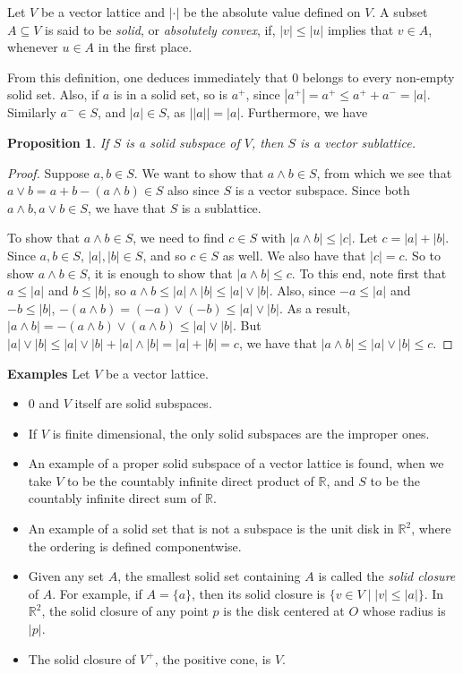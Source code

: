 \documentclass[12pt]{article}
\newtheorem{prop}{Proposition}
\begin{document}
Let $V$ be a vector lattice and $|\cdot|$ be the absolute value defined on $V$.  A subset $A\subseteq V$ is said to be \emph{solid}, or \emph{absolutely convex}, if, $|v|\le |u|$ implies that $v\in A$, whenever $u\in A$ in the first place.

From this definition, one deduces immediately that $0$ belongs to every non-empty solid set.  Also, if $a$ is in a solid set, so is $a^+$, since $|a^+|=a^+\le a^++a^-=|a|$.  Similarly $a^-\in S$, and $|a|\in S$, as $||a||=|a|$.  Furthermore, we have 
\begin{prop}  If $S$ is a solid subspace of $V$, then $S$ is a vector sublattice. \end{prop}
\begin{proof}
Suppose $a,b\in S$.  We want to show that $a\wedge b\in S$, from which we see that $a\vee b= a+b-(a\wedge b)\in S$ also since $S$ is a vector subspace.  Since both $a\wedge b, a\vee b\in S$, we have that $S$ is a sublattice.

To show that $a\wedge b\in S$, we need to find $c\in S$ with $|a\wedge b|\le |c|$.  Let $c=|a|+|b|$.  Since $a,b\in S$, $|a|,|b|\in S$, and so $c\in S$ as well.  We also have that $|c|=c$.  So to show $a\wedge b\in S$, it is enough to show that $|a\wedge b|\le c$.  To this end, note first that $a\le |a|$ and $b\le |b|$, so $a\wedge b\le |a|\wedge |b|\le |a|\vee |b|$.  Also, since $-a\le |a|$ and $-b\le |b|$, $-(a\wedge b)=(-a)\vee (-b)\le |a|\vee |b|$.  As a result, $|a\wedge b|=-(a\wedge b)\vee (a\wedge b)\le |a|\vee |b|$.  But $|a|\vee |b|\le |a|\vee |b|+|a|\wedge |b|=|a|+|b|=c$, we have that $|a\wedge b|\le |a|\vee |b| \le c$.
\end{proof}

\textbf{Examples}  Let $V$ be a vector lattice.
\begin{itemize}
\item $0$ and $V$ itself are solid subspaces.  
\item If $V$ is finite dimensional, the only solid subspaces are the improper ones.  
\item An example of a proper solid subspace of a vector lattice is found, when we take $V$ to be the countably infinite direct product of $\mathbb{R}$, and $S$ to be the countably infinite direct sum of $\mathbb{R}$.
\item An example of a solid set that is not a subspace is the unit disk in $\mathbb{R}^2$, where the ordering is defined componentwise.
\item Given any set $A$, the smallest solid set containing $A$ is called the \emph{solid closure} of $A$.  For example, if $A=\lbrace a\rbrace$, then its solid closure is $\lbrace v\in V\mid |v|\le |a|\rbrace$.  In $\mathbb{R}^2$, the solid closure of any point $p$ is the disk centered at $O$ whose radius is $|p|$.
\item The solid closure of $V^+$, the positive cone, is $V$.
\end{itemize}
\end{document}
